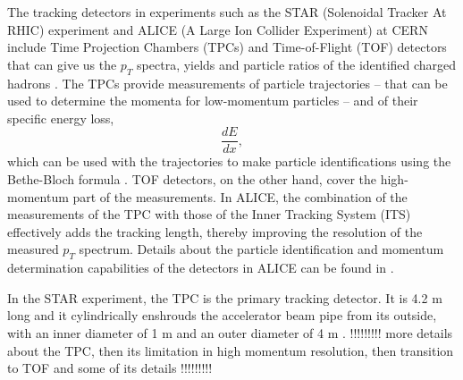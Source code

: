 The tracking detectors in experiments such as the STAR (Solenoidal Tracker At RHIC) experiment and ALICE (A Large Ion Collider Experiment) at CERN include Time Projection Chambers (TPCs) and Time-of-Flight (TOF) detectors that can give us the $p_{T}$ spectra, yields and particle ratios of the identified charged hadrons \cite{Preghenella:2011vy, PhysRevC.96.044904}. The TPCs provide measurements of particle trajectories -- that can be used to determine the momenta for low-momentum particles -- and of their specific energy loss, 
\begin{equation}\label{eqn:specificEnLoss}
	\frac{dE}{dx} ,
\end{equation}
which can be used with the trajectories to make particle identifications using the Bethe-Bloch formula \cite{bethe1953passage}. TOF detectors, on the other hand, cover the high-momentum part of the measurements. In ALICE, the combination of the measurements of the TPC with those of the Inner Tracking System (ITS) effectively adds the tracking length, thereby improving the resolution of the measured $p_{T}$ spectrum. Details about the particle identification and momentum determination capabilities of the detectors in ALICE can be found in \cite{1748-0221-3-08-S08002}.

In the STAR experiment, the TPC is the primary tracking detector. It is 4.2 m long and it cylindrically enshrouds the accelerator beam pipe from its outside, with an inner diameter of 1 m and an outer diameter of 4 m \cite{phdthesisnattrass}. !!!!!!!!! more details about the TPC, then its limitation in high momentum resolution, then transition to TOF and some of its details !!!!!!!!!


